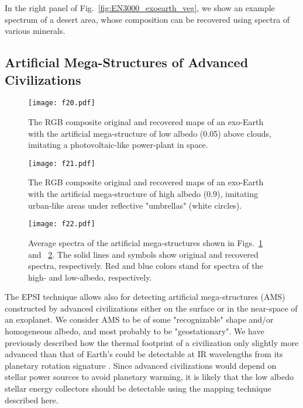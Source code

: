 \documentclass{emulateapj}
\begin{document}
In the right panel of Fig.~\ref{fig:EN3000_exoearth_veg}, we show 
an example spectrum of a desert area, whose composition can be
recovered using spectra of various minerals.

\subsection{Artificial Mega-Structures of Advanced Civilizations}\label{sec:inve_art}

\begin{figure}
\centering
\texttt{[image: f20.pdf]}
\caption{The RGB composite original and recovered maps of an exo-Earth with the 
artificial mega-structure of low albedo (0.05) above clouds, imitating a 
photovoltaic-like power-plant in space.
}
\label{fig:EN3000_exoearth_ams_black}
\end{figure}

\begin{figure}
\centering
\texttt{[image: f21.pdf]}
\caption{The RGB composite original and recovered maps of an exo-Earth with the 
artificial mega-structure of high albedo (0.9), imitating urban-like areas under 
reflective "umbrellas" (white circles).
}
\label{fig:EN3000_exoearth_ams_white}
\end{figure}

\begin{figure}
\centering
\texttt{[image: f22.pdf]}
\caption{Average spectra of the artificial mega-structures 
shown in Figs.~\ref{fig:EN3000_exoearth_ams_black} and ~\ref{fig:EN3000_exoearth_ams_white}.
The solid lines and symbols show original and recovered spectra, respectively.
Red and blue colors stand for spectra of the high- and low-albedo, respectively. 
}
\label{fig:EN3000_exoearth_ams_sp}
\end{figure}

The EPSI technique allows also for detecting artificial mega-structures (AMS)
constructed by advanced civilizations
either on the surface or in the near-space of an exoplanet. 
We consider AMS to be of some "recognizable" shape and/or 
homogeneous albedo, and most probably to be "geostationary". We have previously
described how the thermal footprint of a civilization only slightly more advanced than that of Earth's
could be detectable at IR wavelengths from its planetary rotation signature \citep{kuhnberd2015}. Since
advanced civilizations would depend on stellar power sources to avoid planetary warming, it is likely that the
low albedo stellar energy collectors should be detectable using the mapping technique described here.
\end{document}
